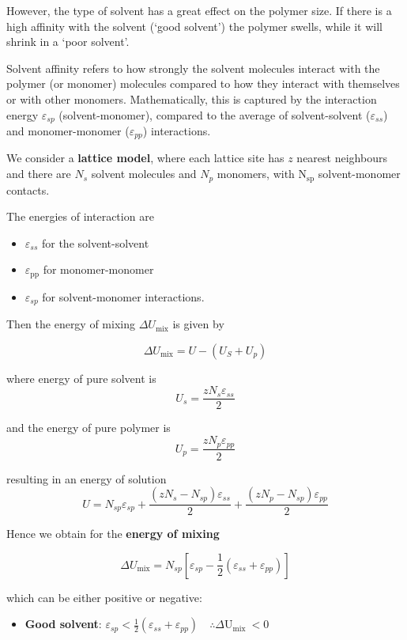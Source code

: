 \documentclass[
  letterpaper,
  enabledeprecatedfontcommands]{report}
\providecommand{\tightlist}{%
  \setlength{\itemsep}{0pt}\setlength{\parskip}{0pt}}
\begin{document}
However, the type of solvent has a great effect on the polymer size. If
there is a high affinity with the solvent (`good solvent') the polymer
swells, while it will shrink in a `poor solvent'.

Solvent affinity refers to how strongly the solvent molecules interact
with the polymer (or monomer) molecules compared to how they interact
with themselves or with other monomers. Mathematically, this is captured
by the interaction energy \(\varepsilon_{sp}\) (solvent-monomer),
compared to the average of solvent-solvent (\(\varepsilon_{ss}\)) and
monomer-monomer (\(\varepsilon_{pp}\)) interactions.

We consider a \textbf{lattice model}, where each lattice site has \(z\)
nearest neighbours and there are \(N_{s}\) solvent molecules and
\(N_{p}\) monomers, with \(\mathrm{N}_{\mathrm{sp}}\) solvent-monomer
contacts.

The energies of interaction are

\begin{itemize}
\tightlist
\item
  \(\varepsilon_{s s}\) for the solvent-solvent
\item
  \(\varepsilon_{\mathrm{pp}}\) for monomer-monomer
\item
  \(\varepsilon_{s p}\) for solvent-monomer interactions.
\end{itemize}

Then the energy of mixing \(\Delta U_{\operatorname{mix}}\) is given by

\[
\Delta U_{\operatorname{mix}}=U-\left(U_{S}+U_{p}\right)
\]

where energy of pure solvent is
\[U_{s}=\frac{z N_{s} \varepsilon_{s s}}{2}\]

and the energy of pure polymer is
\[U_{p}=\frac{z N_{p} \varepsilon_{p p}}{2}\]

resulting in an energy of solution
\[U=N_{s p} \varepsilon_{s p}+\frac{\left(z N_{s}-N_{s p}\right) \varepsilon_{s s}}{2}+\frac{\left(z N_{p}-N_{s p}\right) \varepsilon_{p p}}{2}\]

Hence we obtain for the \textbf{energy of mixing}

\[
\Delta U_{\mathrm{mix}}=N_{s p}\left[\varepsilon_{s p}-\frac{1}{2}\left(\varepsilon_{s s}+\varepsilon_{p p}\right)\right]
\]

which can be either positive or negative:

\begin{itemize}
\tightlist
\item
  \textbf{Good solvent}:
  \(\varepsilon_{s p}<\frac{1}{2}\left(\varepsilon_{s s}+\varepsilon_{p p}\right) \quad \therefore \Delta \mathrm{U}_{\text {mix }}<0\)
\end{itemize}
\end{document}
